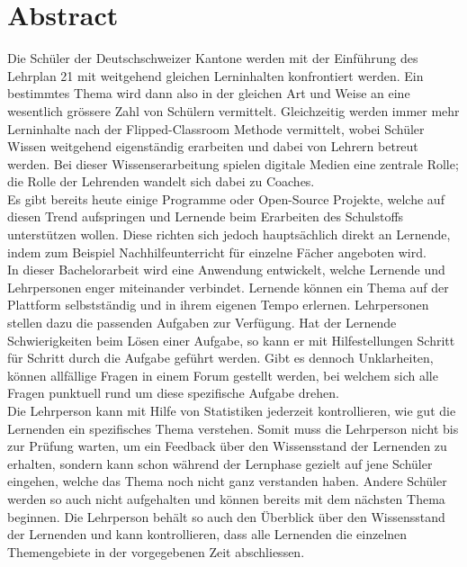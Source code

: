 \afterpage{\blankpage}
\section*{Abstract}

Die Schüler der Deutschschweizer Kantone werden mit der Einführung des Lehrplan 21 mit weitgehend gleichen Lerninhalten konfrontiert werden. Ein bestimmtes Thema wird dann also in der gleichen Art und Weise an eine wesentlich grössere Zahl von Schülern vermittelt. Gleichzeitig werden immer mehr Lerninhalte nach der Flipped-Classroom Methode vermittelt, wobei Schüler Wissen weitgehend eigenständig erarbeiten und dabei von Lehrern betreut werden. Bei dieser Wissenserarbeitung spielen digitale Medien eine zentrale Rolle; die Rolle der Lehrenden wandelt sich dabei zu Coaches. \\

Es gibt bereits heute einige Programme oder Open-Source Projekte, welche auf diesen Trend aufspringen und Lernende beim Erarbeiten des Schulstoffs unterstützen wollen. Diese richten sich jedoch hauptsächlich direkt an Lernende, indem zum Beispiel Nachhilfeunterricht für einzelne Fächer angeboten wird. \\

In dieser Bachelorarbeit wird eine Anwendung entwickelt, welche Lernende und Lehrpersonen enger miteinander verbindet. Lernende können ein Thema auf der Plattform selbstständig und in ihrem eigenen Tempo erlernen. Lehrpersonen stellen dazu die passenden Aufgaben zur Verfügung. Hat der Lernende Schwierigkeiten beim Lösen einer Aufgabe, so kann er mit Hilfestellungen Schritt für Schritt durch die Aufgabe geführt werden. Gibt es dennoch Unklarheiten, können allfällige Fragen in einem Forum gestellt werden, bei welchem sich alle Fragen punktuell rund um diese spezifische Aufgabe drehen. \\

Die Lehrperson kann mit Hilfe von Statistiken jederzeit kontrollieren, wie gut die Lernenden ein spezifisches Thema verstehen. Somit muss die Lehrperson nicht bis zur Prüfung warten, um ein Feedback über den Wissensstand der Lernenden zu erhalten, sondern kann schon während der Lernphase gezielt auf jene Schüler eingehen, welche das Thema noch nicht ganz verstanden haben. Andere Schüler werden so auch nicht aufgehalten und können bereits mit dem nächsten Thema beginnen. Die Lehrperson behält so auch den Überblick über den Wissensstand der Lernenden und kann kontrollieren, dass alle Lernenden die einzelnen Themengebiete in der vorgegebenen Zeit abschliessen.


\newpage